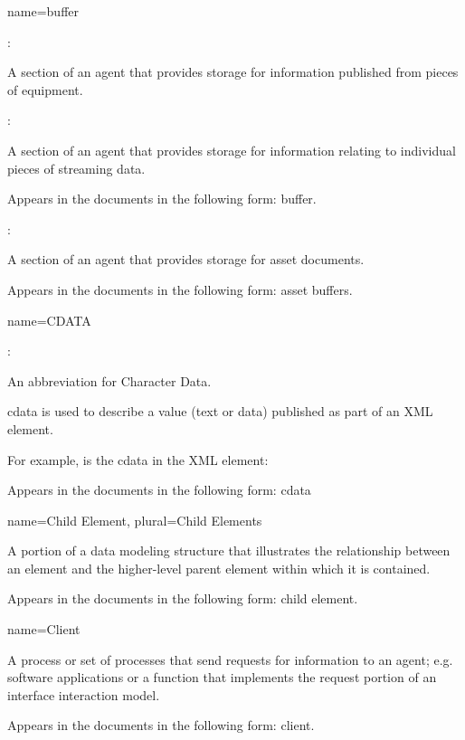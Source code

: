 {
  name={buffer}
}
{
  :

  A section of an \gls{agent} that provides storage for information published from pieces of equipment.

  :

  A section of an \gls{agent} that provides storage for information relating to individual pieces of \gls{streaming data}. 
  
  Appears in the documents in the following form: \gls{buffer}.

  :

  A section of an \gls{agent} that provides storage for \glspl{asset document}.

  Appears in the documents in the following form: \glspl{asset buffer}.
}

{
  name={\normalfont CDATA}
}
{
  :

  An abbreviation for Character Data.

  \gls{cdata} is used to describe a value (text or data) published as part of an XML element.

  For example,  is the \gls{cdata} in the XML element:
  
  \tab {}

  Appears in the documents in the following form: \gls{cdata}
}


{
  name={Child Element},
  plural={Child Elements}
}
{
  A portion of a data modeling structure that illustrates the relationship between an element and the higher-level \gls{parent element} within which it is contained.
  
  Appears in the documents in the following form: \gls{child element}.
}


{
  name={Client}
}
{
  A process or set of processes that send \glspl{request} for information to an \gls{agent}; e.g. software applications or a function that implements the \gls{request} portion of an \gls{interface} \gls{interaction model}.

  Appears in the documents in the following form: client.
}

